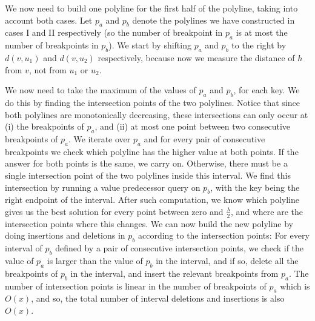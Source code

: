 \documentclass[a4paper,UKenglish]{lipics-v2016}
\theoremstyle{plain}
\begin{document}

\vspace{0.04in} 
We now need to build one polyline for the first half of the polyline, taking into account both cases. Let $p_a$ and $p_b$ denote the polylines we have constructed in cases I and II respectively (so the number of breakpoint in $p_a$ is at most the number of breakpoints in $p_b$). We start by shifting $p_a$ and $p_b$ to the right by $d(v,u_1)$ and $d(v,u_2)$ respectively, because now we measure the distance of $h$ from $v$, not from $u_1$ or $u_2$. 

We now need to take the maximum of the values of $p_a$ and $p_b$, for each key. We do this by finding the intersection points of the two polylines. Notice that since both polylines are monotonically decreasing, these intersections can only occur at (i) the breakpoints of $p_a$, and (ii) at most one point between two consecutive breakpoints of $p_a$. We iterate over $p_a$ and for every pair of consecutive breakpoints we check which polyline has the higher value at both points. If the answer for both points is the same, we carry on. Otherwise, there must be a single intersection point of the two polylines inside this interval. We find this intersection by running a value predecessor query on $p_b$, with the key being the right endpoint of the interval. After such computation, we know which polyline gives us the best solution for every point between zero and $\frac{\lambda}{2}$, and where are the intersection points where this changes. We can now build the new polyline by doing insertions and deletions in $p_b$ according to the intersection points: For every interval of $p_b$ defined by a pair of consecutive intersection points, we check if the value of $p_a$ is larger than the value of $p_b$ in the interval, and if so, delete all the breakpoints of $p_b$ in the interval, and insert the relevant breakpoints from $p_a$. The number of intersection points is linear in the number of breakpoints of $p_a$ which is $O(x)$, and so, the total number of interval deletions and insertions is also $O(x)$.
\end{document}
